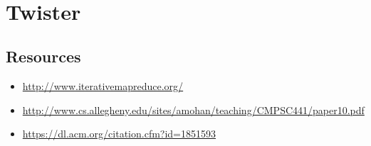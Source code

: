 \MDNAME\

\section{Twister}


\subsection{Resources}

\begin{itemize}
\item
  \url{http://www.iterativemapreduce.org/}
\item
  \url{http://www.cs.allegheny.edu/sites/amohan/teaching/CMPSC441/paper10.pdf}
\item
  \url{https://dl.acm.org/citation.cfm?id=1851593}
\end{itemize}

